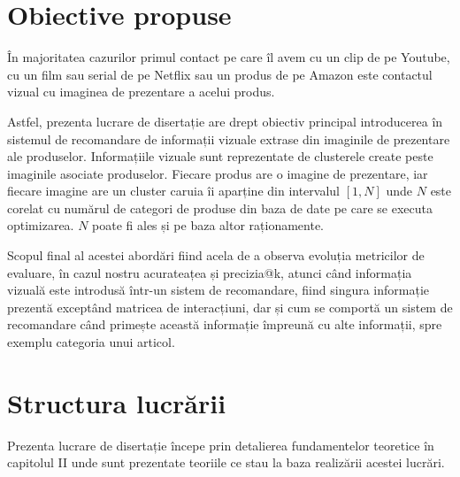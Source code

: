 \section{Obiective propuse}
În majoritatea cazurilor primul contact pe care îl avem cu un clip de pe Youtube, cu un film sau serial de pe Netflix sau un produs de pe Amazon este contactul vizual cu imaginea de prezentare a acelui produs.

Astfel, prezenta lucrare de disertație are drept obiectiv principal introducerea în sistemul de recomandare de informații vizuale extrase din imaginile de prezentare ale produselor. Informațiile vizuale sunt reprezentate de clusterele create peste imaginile asociate produselor. Fiecare produs are o imagine de prezentare, iar fiecare imagine are un cluster caruia îi aparține din intervalul $[1, N]$ unde $N$ este corelat cu numărul de categori de produse din baza de date pe care se executa optimizarea. $N$ poate fi ales și pe baza altor raționamente.

Scopul final al acestei abordări fiind acela de a observa evoluția metricilor de evaluare, în cazul nostru acurateațea și precizia@k, atunci când informația vizuală este introdusă într-un sistem de recomandare, fiind singura informație prezentă exceptând matricea de interacțiuni, dar și cum se comportă un sistem de recomandare când primește această informație împreună cu alte informații, spre exemplu categoria unui articol.

\section{Structura lucrării}
Prezenta lucrare de disertație începe prin detalierea fundamentelor teoretice în capitolul II unde sunt prezentate teoriile ce stau la baza realizării acestei lucrări.